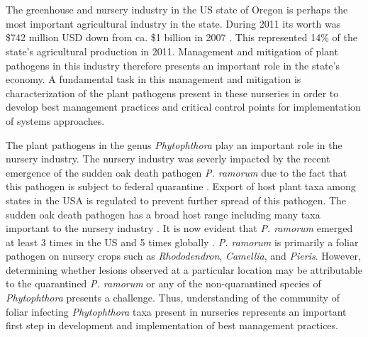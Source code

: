 \documentclass[12pt]{article}
\begin{document}

\noindent\makebox[\linewidth]{\rule{\textwidth}{1pt}} 




\section*{} %

\linenumbers

The greenhouse and nursery industry in the US state of Oregon is perhaps the most important agricultural industry in the state.  During 2011 its worth was \$742 million USD down from ca. \$1 billion in 2007 \cite{oda_2012}.  This represented 14\% of the state's agricultural production in 2011.  Management and mitigation of plant pathogens in this industry therefore presents an important role in the state's economy.  A fundamental task in this management and mitigation is characterization of the plant pathogens present in these nurseries in order to develop best management practices and critical control points for implementation of systems approaches\cite{parke_grunwald_2012}.

The plant pathogens in the genus \emph{Phytophthora} play an important role in the nursery industry. The nursery industry was severly impacted by the recent emergence of the sudden oak death pathogen \emph{P. ramorum} due to the fact that this pathogen is subject to federal quarantine \cite{werres_etal_2001,grunwald_etal_2008}.  Export of host plant taxa among states in the USA is regulated to prevent further spread of this pathogen.  The sudden oak death pathogen has a broad host range including many taxa important to the nursery industry \cite{tooley_etal_2004, hansen_etal_2005}.  It is now evident that \emph{P. ramorum} emerged at least 3 times in the US and 5 times globally \cite{grunwald_etal_2012,van_poucke_etal_2012}. \emph{P. ramorum} is primarily a foliar pathogen on nursery crops such as \emph{Rhododendron}, \emph{Camellia}, and \emph{Pieris}. However, determining whether lesions observed at a particular location may be attributable to the quarantined \emph{P. ramorum} or any of the non-quarantined species of \emph{Phytophthora} presents a challenge.  Thus, understanding of the community of foliar infecting \emph{Phytophthora} taxa present in nurseries represents an important first step in development and implementation of best management practices.
\end{document}
